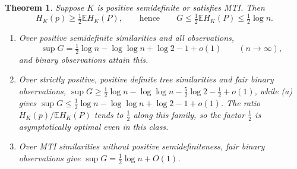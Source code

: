 \documentclass[11pt,a4paper]{article}
\newtheorem{theorem}{Theorem}
\theoremstyle{remark}
\begin{document}
\begin{theorem}\label{th:half}
Suppose $K$ is positive semidefinite or satisfies MTI. Then
\[
 H_K(p)\ge\tfrac12\mathbb{E}H_K(P),\qquad\text{hence}\qquad G\le\tfrac12\mathbb E H_K(P)\le\tfrac12\log n .
\]
\begin{enumerate}
\item[(a)] Over positive semidefinite similarities and all observations,
\[
 \sup G=\tfrac12\log n-\log\log n+\log 2-1+o(1)\qquad(n\to\infty),
\]
and binary observations attain this.
\item[(b)] Over strictly positive, positive definite tree similarities and fair binary observations, $\sup G\ge\tfrac12\log n-\log\log n-\tfrac52\log2-\tfrac12+o(1)$, while (a) gives $\sup G\le\tfrac12\log n-\log\log n+\log2-1+o(1)$. The ratio $H_K(p)/\mathbb E H_K(P)$ tends to $\tfrac12$ along this family, so the factor $\tfrac12$ is asymptotically optimal even in this class.
\item[(c)] Over MTI similarities without positive semidefiniteness, fair binary observations give $\sup G=\tfrac12\log n+O(1)$.
\end{enumerate}
\end{theorem}
\end{document}
